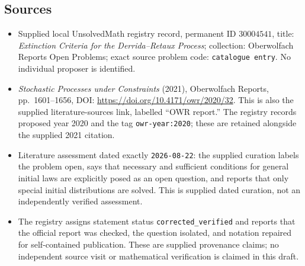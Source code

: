 \documentclass[11pt]{article}
\begin{document}
\subsection{Sources}
\begin{itemize}
\item Supplied local UnsolvedMath registry record, permanent ID \(30004541\), title: \emph{Extinction Criteria for the Derrida--Retaux Process}; collection: Oberwolfach Reports Open Problems; exact source problem code: \texttt{catalogue entry}. No individual proposer is identified.
\item \emph{Stochastic Processes under Constraints} (2021), Oberwolfach Reports, pp.~1601--1656, DOI: \url{https://doi.org/10.4171/owr/2020/32}. This is also the supplied literature-sources link, labelled ``OWR report.'' The registry records proposed year 2020 and the tag \texttt{owr-year:2020}; these are retained alongside the supplied 2021 citation.
\item Literature assessment dated exactly \texttt{2026-08-22}: the supplied curation labels the problem open, says that necessary and sufficient conditions for general initial laws are explicitly posed as an open question, and reports that only special initial distributions are solved. This is supplied dated curation, not an independently verified assessment.
\item The registry assigns statement status \texttt{corrected\_verified} and reports that the official report was checked, the question isolated, and notation repaired for self-contained publication. These are supplied provenance claims; no independent source visit or mathematical verification is claimed in this draft.
\end{itemize}
\end{document}
